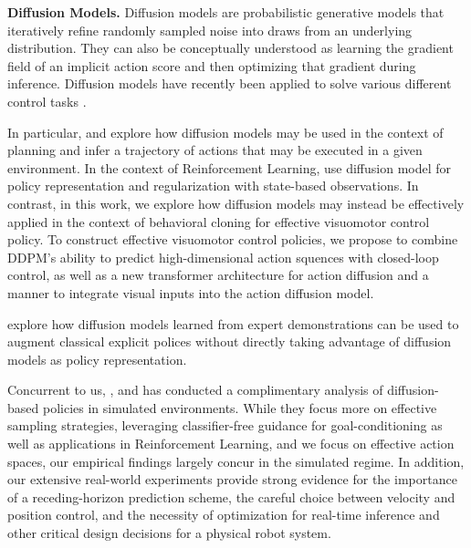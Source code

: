 \textbf{Diffusion Models.}
Diffusion models are probabilistic generative models that iteratively refine randomly sampled noise into draws from an underlying distribution. They can also be conceptually understood as learning the gradient field of an implicit action score and then optimizing that gradient during inference.
Diffusion models \citep{sohldickstein2015nonequilibrium, ho2020denoising} have recently been applied to solve various different control tasks \citep{janner2022diffuser, urain2022se, ajay2022conditional}.

In particular, \citet{janner2022diffuser} and \citet{huang2023diffusion} explore how diffusion models may be  used in the context of planning and infer a trajectory of actions that may be executed in a given environment.
In the context of Reinforcement Learning, \citet{wang2022diffusion} use diffusion model for policy representation and regularization with state-based observations.
In contrast, in this work, we explore how diffusion models may instead be effectively applied in the context of behavioral cloning for effective visuomotor control policy.
To construct effective visuomotor control policies, we propose to combine DDPM's ability to predict high-dimensional action squences with closed-loop control, as well as a new transformer architecture for action diffusion and a manner to integrate visual inputs into the action diffusion model.

\citet{wang2023diffusion} explore how diffusion models learned from expert demonstrations can be used to augment classical explicit polices without directly taking advantage of diffusion models as policy representation.

Concurrent to us, \citet{pearce2023imitating}, \citet{reuss2023goal} and \citet{hansen2023idql} has conducted a complimentary analysis of diffusion-based policies in simulated environments. While they focus more on effective sampling strategies, leveraging classifier-free guidance for goal-conditioning as well as applications in Reinforcement Learning, and we focus on effective action spaces, our empirical findings largely concur in the simulated regime.  In addition, our extensive real-world experiments provide strong evidence for the importance of a receding-horizon prediction scheme, the careful choice between velocity and position control, and the necessity of optimization for real-time inference and other critical design decisions for a physical robot system.
